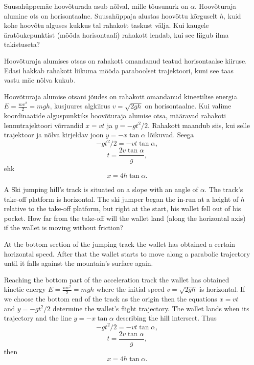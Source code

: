 
Suusahüppemäe hoovõturada asub nõlval, mille tõusunurk on $\alpha$. Hoovõturaja alumine
ots on horisontaalne. Suusahüppaja alustas hoovõttu kõrguselt $h$,
kuid kohe hoovõtu alguses kukkus tal rahakott taskust välja. Kui kaugele
äratõukepunktist (mööda
horisontaali) rahakott lendab, kui see liigub ilma takistuseta?

\hint
Hoovõturaja alumises otsas on rahakott omandanud teatud horisontaalse kiiruse. Edasi hakkab rahakott liikuma mööda paraboolset trajektoori, kuni see taas vastu mäe nõlva kukub.

\solu
Hoovõturaja alumise otsani jõudes on rahakott omandanud kineetilise energia $E=\frac{mv^2}{2}=mgh$, kusjuures algkiirus $v=\sqrt{2gh}$ on horisontaalne. Kui valime koordinaatide alguspunktiks hoovõturaja alumise otsa, määravad rahakoti lennutrajektoori võrrandid $x=vt$ ja $y=-gt^2 / 2$. Rahakott maandub siis, kui selle trajektoor ja nõlva kirjeldav joon $y=-x\tan\alpha$ lõikuvad. Seega 
$$-gt^2 / 2=-vt\tan\alpha,$$ 
$$t=\frac{2v \tan \alpha}{g},$$ 
ehk
$$x=4h \tan\alpha.$$

A Ski jumping hill’s track is situated on a slope with an angle of $\alpha$. The track’s take-off platform is horizontal. The ski jumper began the in-run at a height of $h$ relative to the take-off platform, but right at the start, his wallet fell out of his pocket. How far from the take-off will the wallet land (along the horizontal axis) if the wallet is moving without friction?

\hinteng
At the bottom section of the jumping track the wallet has obtained a certain horizontal speed. After that the wallet starts to move along a parabolic trajectory until it falls against the mountain’s surface again.

\solueng
Reaching the bottom part of the acceleration track the wallet has obtained kinetic energy $E=\frac{mv^2}{2}=mgh$ where the initial speed $v=\sqrt{2gh}$ is horizontal. If we choose the bottom end of the track as the origin then the equations $x=vt$ and $y=-gt^2 / 2$ determine the wallet’s flight trajectory. The wallet lands when its trajectory and the line $y=-x\tan\alpha$ describing the hill intersect. Thus
$$-gt^2 / 2=-vt\tan\alpha,$$
$$t=\frac{2v \tan \alpha}{g},$$
then $$x=4h \tan\alpha.$$
\probend